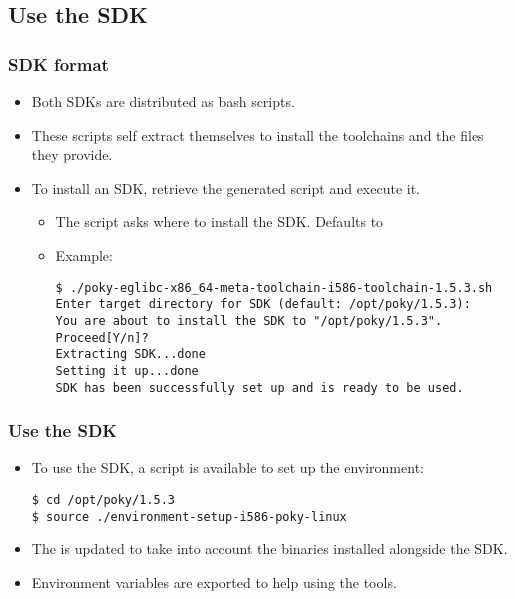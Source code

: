 \subsection{Use the SDK}

\begin{frame}[fragile]
  \frametitle{SDK format}
  \begin{itemize}
    \item Both SDKs are distributed as bash scripts.
    \item These scripts self extract themselves to install the
      toolchains and the files they provide.
    \item To install an SDK, retrieve the generated script and execute
      it.
      \begin{itemize}
        \item The script asks where to install the SDK. Defaults to
        \item Example: 
        \begin{block}{}
          \begin{verbatim}
$ ./poky-eglibc-x86_64-meta-toolchain-i586-toolchain-1.5.3.sh
Enter target directory for SDK (default: /opt/poky/1.5.3):
You are about to install the SDK to "/opt/poky/1.5.3". Proceed[Y/n]?
Extracting SDK...done
Setting it up...done
SDK has been successfully set up and is ready to be used.
          \end{verbatim}
        \end{block}
      \end{itemize}
  \end{itemize}
\end{frame}

\begin{frame}[fragile]
  \frametitle{Use the SDK}
  \begin{itemize}
    \item To use the SDK, a script is available to set up the
      environment:
      \begin{block}{}
        \begin{verbatim}
$ cd /opt/poky/1.5.3
$ source ./environment-setup-i586-poky-linux
        \end{verbatim}
      \end{block}
    \item The  is updated to take into account the binaries
      installed alongside the SDK.
    \item Environment variables are exported to help using the tools.
  \end{itemize}
\end{frame}


